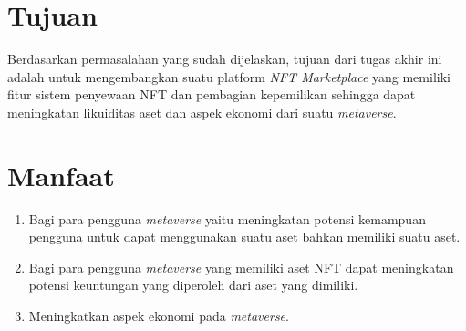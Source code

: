 \section{Tujuan}

Berdasarkan permasalahan yang sudah dijelaskan, tujuan dari tugas akhir ini adalah untuk mengembangkan suatu platform \emph{NFT Marketplace} yang memiliki fitur sistem penyewaan NFT dan pembagian kepemilikan sehingga dapat meningkatan likuiditas aset dan aspek ekonomi dari suatu \emph{metaverse}.

\section{Manfaat}

\begin{enumerate}
  \item Bagi para pengguna \emph{metaverse} yaitu meningkatan potensi kemampuan pengguna untuk dapat menggunakan suatu aset bahkan memiliki suatu aset.
  \item Bagi para pengguna \emph{metaverse} yang memiliki aset NFT dapat meningkatan potensi keuntungan yang diperoleh dari aset yang dimiliki.
  \item Meningkatkan aspek ekonomi pada \emph{metaverse}.
\end{enumerate}

